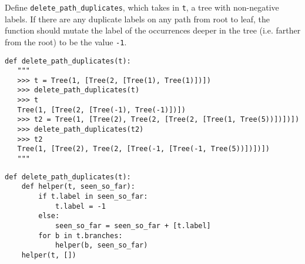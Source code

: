 \begin{blocksection}
\question
Define \texttt{delete\_path\_duplicates}, which takes in \texttt{t}, a tree
with non-negative labels. If there are any duplicate labels on any path 
from root to leaf, the function should mutate the label of the occurrences
deeper in the tree (i.e. farther from the root) to be the value \texttt{-1}.

\begin{lstlisting}
def delete_path_duplicates(t):
   """
   >>> t = Tree(1, [Tree(2, [Tree(1), Tree(1)])])
   >>> delete_path_duplicates(t)
   >>> t
   Tree(1, [Tree(2, [Tree(-1), Tree(-1)])])
   >>> t2 = Tree(1, [Tree(2), Tree(2, [Tree(2, [Tree(1, Tree(5))])])])
   >>> delete_path_duplicates(t2)
   >>> t2
   Tree(1, [Tree(2), Tree(2, [Tree(-1, [Tree(-1, Tree(5))])])])
   """
\end{lstlisting}

\begin{solution}[2in]
\begin{lstlisting}
def delete_path_duplicates(t):
    def helper(t, seen_so_far):
        if t.label in seen_so_far:
            t.label = -1
        else:
            seen_so_far = seen_so_far + [t.label]
        for b in t.branches:
            helper(b, seen_so_far)
    helper(t, [])
\end{lstlisting}
\end{solution}
\end{blocksection}